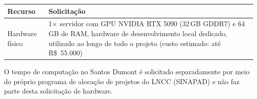 \documentclass[12pt,a4paper]{article}
\begin{document}
\begin{longtable}{@{}p{}p{}@{}}
\toprule
\textbf{Recurso} & \textbf{Solicitação}\\
\midrule
\endhead
\bottomrule
\endfoot
Hardware físico & 1$\times$ servidor com GPU NVIDIA RTX 5090 (32\,GB
GDDR7) e 64\,GB de RAM, hardware de desenvolvimento local dedicado,
utilizado ao longo de todo o projeto (custo estimado: até R\$~55.000)\\
\end{longtable}

O tempo de computação no Santos Dumont é solicitado separadamente por meio do
próprio programa de alocação de projetos do LNCC (SINAPAD) e não faz parte
desta solicitação de hardware.



\end{document}
